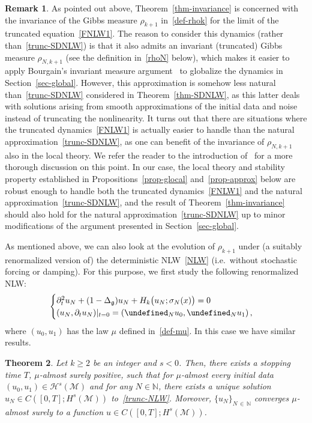 \documentclass[10pt]{amsart}
\newtheorem{theo}{Theorem}[section]
\theoremstyle{definition}\newtheorem{defi}[theo]{Definition}\newtheorem{rema}[theo]{Remark}\newtheorem{exam}[theo]{Example}\newtheorem{exem}[theo]{Example}\newtheorem{nota}[theo]{Notation}
\newcommand{\N}{\mathbb{N}}
\let\P= \undefined
\newcommand{\P}{\mathbf{P}}
\newcommand{\M}{\mathcal{M}}
\renewcommand{\H}{\mathcal{H}}
\newcommand{\g}{\mathfrak{g}}
\newcommand{\Dlg}{\Delta_{\g}}
\newcommand{\s}{\sigma}
\newcommand{\dt}{\partial_t}
\begin{document}
\begin{rema}\label{REM:tronc}
As pointed out above, Theorem~\ref{thm-invariance} is concerned with the invariance of the Gibbs measure $\rho_{k+1}$ in~\eqref{def-rhok} for the limit of the truncated equation~\eqref{FNLW1}. The reason to consider this dynamics (rather than~\eqref{trunc-SDNLW}) is that it also admits an invariant (truncated) Gibbs measure $\rho_{N,k+1}$ (see the definition in~\eqref{rhoN} below), which makes it easier to apply Bourgain's invariant measure argument~\cite{BO94,BO96} to globalize the dynamics in Section~\ref{sec-global}. However, this approximation is somehow less natural than~\eqref{trunc-SDNLW} considered in Theorem~\ref{thm-SDNLW}, as this latter deals with solutions arising from smooth approximations of the initial data and noise instead of truncating the nonlinearity. It turns out that there are situations where the truncated dynamics~\eqref{FNLW1} is actually easier to handle than the natural approximation~\eqref{trunc-SDNLW}, as one can benefit of the invariance of $\rho_{N,k+1}$ also in the local theory. We refer the reader to the introduction of~\cite{STz} for a more thorough discussion on this point. In our case, the local theory and stability property established in Propositions~\ref{prop-glocal} and~\ref{prop-approx} below are robust enough to handle both the truncated dynamics~\eqref{FNLW1} and the natural approximation~\eqref{trunc-SDNLW}, and the result of Theorem~\ref{thm-invariance} should also hold for the natural approximation~\eqref{trunc-SDNLW} up to minor modifications of the argument presented in Section~\ref{sec-global}.
\end{rema}

As mentioned above, we can also look at the evolution of $\rho_{k+1}$ under (a suitably renormalized version of) the deterministic NLW~\eqref{NLW} (i.e.~without stochastic forcing or damping). For this purpose, we first study the following renormalized NLW:
\begin{equation}\label{trunc-NLW}
\begin{cases}
\dt^2 u_N + (1- \Dlg) u_N + H_k\big(u_N;\s_N(x)\big) = 0 \\
(u_N,\dt u_N)|_{t=0}=\left(\P_Nu_0,\P_Nu_1\right),
\end{cases}
\end{equation}
where $(u_0,u_1)$ has the law $\mu$ defined in~\eqref{def-mu}. In this case we have similar results.

\begin{theo}\label{THM:LWP}
Let $k \geq 2$ be an integer and $s<0$. Then, there exists a stopping time $T$, $\mu$-almost surely positive, such that for $\mu$-almost every initial data $(u_0,u_1)\in\H^s(\M)$ and for any $N\in \N$, there exists a unique solution $u_N \in C([0,T];H^{s}(\M))$ to~\eqref{trunc-NLW}. Moreover, $\{u_N\}_{N\,\in\,\N}$ converges $\mu$-almost surely to a function $u\in C([0,T];H^{s}(\M))$.
\end{theo}
\end{document}
